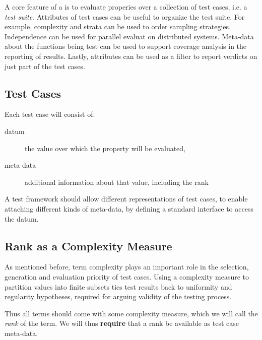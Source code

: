 A core feature of a \pbt is to evaluate properies over a
collection of test cases, i.e. a \emph{test suite}.
Attributes of test cases can be useful to organize the test suite.
For example, complexity and strata can be used to order sampling
strategies. Independence can be used for parallel evaluat on distributed
systems. Meta-data about the functions being test can be used to support
coverage analysis in the reporting of results. Lastly, attributes can
be used as a filter to report verdicts on just part of the test cases.

\subsection{Test Cases}

Each test case will consist of:

\begin{description}
    \item[datum] the value over which the property will be evaluated,
    \item[meta-data] additional information about that value, including the rank
\end{description} 
\noindent
A test framework should allow different representations of test cases,
to enable attaching different kinds of meta-data,
by defining a standard interface to access the datum.

\subsection{Rank as a Complexity Measure }\label{sub:reqrank}

As mentioned before, term complexity plays an important role
in the selection, generation and evaluation priority of test cases.
Using a complexity measure to partition values into finite subsets
ties test results back to uniformity and regularity hypotheses,
required for arguing validity of the testing process.

Thus all terms should come with some complexity measure, which we will call
the \emph{rank} of the term. We will thus \textbf{require} that a rank
be available as test case meta-data.

